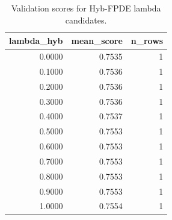 \begin{table}[t]
\caption{Validation scores for Hyb-FPDE lambda candidates.}
\label{tab:lambda_distribution_computed}
\centering
\begin{tabular}{rrr}
\toprule
lambda\_hyb & mean\_score & n\_rows \\
\midrule
0.0000 & 0.7535 & 1 \\
0.1000 & 0.7536 & 1 \\
0.2000 & 0.7536 & 1 \\
0.3000 & 0.7536 & 1 \\
0.4000 & 0.7537 & 1 \\
0.5000 & 0.7553 & 1 \\
0.6000 & 0.7553 & 1 \\
0.7000 & 0.7553 & 1 \\
0.8000 & 0.7553 & 1 \\
0.9000 & 0.7553 & 1 \\
1.0000 & 0.7554 & 1 \\
\bottomrule
\end{tabular}

\end{table}
